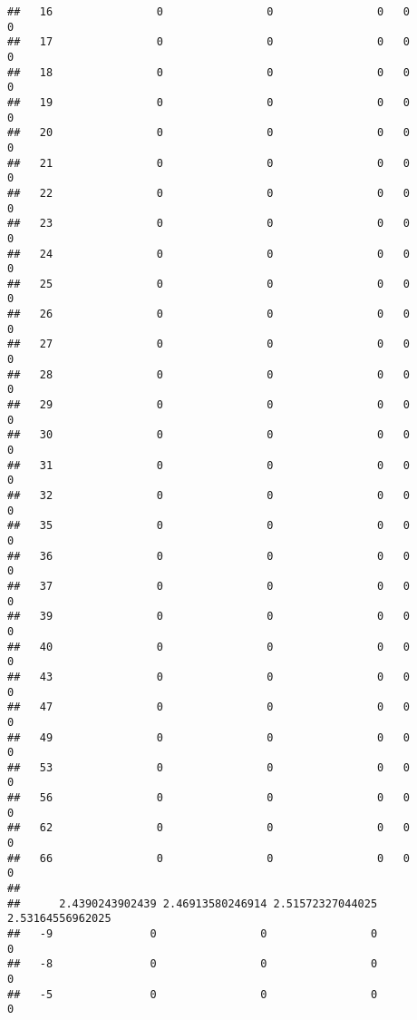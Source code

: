 \documentclass[]{article}
\begin{document}
\begin{verbatim}
##   16                0                0                0   0                0
##   17                0                0                0   0                0
##   18                0                0                0   0                0
##   19                0                0                0   0                0
##   20                0                0                0   0                0
##   21                0                0                0   0                0
##   22                0                0                0   0                0
##   23                0                0                0   0                0
##   24                0                0                0   0                0
##   25                0                0                0   0                0
##   26                0                0                0   0                0
##   27                0                0                0   0                0
##   28                0                0                0   0                0
##   29                0                0                0   0                0
##   30                0                0                0   0                0
##   31                0                0                0   0                0
##   32                0                0                0   0                0
##   35                0                0                0   0                0
##   36                0                0                0   0                0
##   37                0                0                0   0                0
##   39                0                0                0   0                0
##   40                0                0                0   0                0
##   43                0                0                0   0                0
##   47                0                0                0   0                0
##   49                0                0                0   0                0
##   53                0                0                0   0                0
##   56                0                0                0   0                0
##   62                0                0                0   0                0
##   66                0                0                0   0                0
##     
##      2.4390243902439 2.46913580246914 2.51572327044025 2.53164556962025
##   -9               0                0                0                0
##   -8               0                0                0                0
##   -5               0                0                0                0

\end{verbatim}
\end{document}
